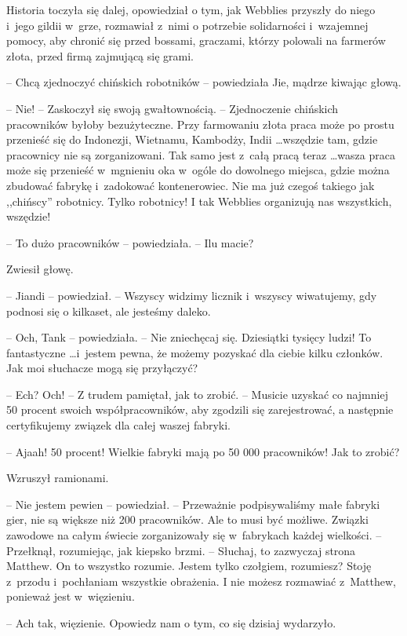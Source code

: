 \documentclass[oneside,polish,11pt,rmheadings]{mwbk}
\begin{document}
Historia toczyła się dalej, opowiedział o tym, jak Webblies przyszły do niego i~jego gildii w~grze, rozmawiał z~nimi o potrzebie solidarności i~wzajemnej pomocy, aby chronić się przed bossami, graczami, którzy polowali na farmerów złota, przed firmą zajmującą się grami.

-- Chcą zjednoczyć chińskich robotników -- powiedziała Jie, mądrze kiwając głową.

-- Nie! -- Zaskoczył się swoją gwałtownością. -- Zjednoczenie chińskich pracowników byłoby bezużyteczne. Przy farmowaniu złota praca może po prostu przenieść się do Indonezji, Wietnamu, Kambodży, Indii  \ldots  wszędzie tam, gdzie pracownicy nie są zorganizowani. Tak samo jest z~całą pracą teraz  \ldots  wasza praca może się przenieść w~mgnieniu oka w~ogóle do dowolnego miejsca, gdzie można zbudować fabrykę i~zadokować kontenerowiec. Nie ma już czegoś takiego jak ,,chińscy'' robotnicy. Tylko robotnicy! I tak Webblies organizują nas wszystkich, wszędzie!

-- To dużo pracowników -- powiedziała. -- Ilu macie? 

Zwiesił głowę. 

-- Jiandi -- powiedział. -- Wszyscy widzimy licznik i~wszyscy wiwatujemy, gdy podnosi się o kilkaset, ale jesteśmy daleko.

-- Och, Tank -- powiedziała. -- Nie zniechęcaj się. Dziesiątki tysięcy ludzi! To fantastyczne  \ldots  i~jestem pewna, że możemy pozyskać dla ciebie kilku członków. Jak moi słuchacze mogą się przyłączyć?

-- Ech? Och! -- Z trudem pamiętał, jak to zrobić. -- Musicie uzyskać co najmniej 50 procent swoich współpracowników, aby zgodzili się zarejestrować, a następnie certyfikujemy związek dla całej waszej fabryki.

-- Ajaah! 50 procent! Wielkie fabryki mają po 50 000 pracowników! Jak to zrobić? 

Wzruszył ramionami. 

-- Nie jestem pewien -- powiedział. -- Przeważnie podpisywaliśmy małe fabryki gier, nie są większe niż 200 pracowników. Ale to musi być możliwe. Związki zawodowe na całym świecie zorganizowały się w~fabrykach każdej wielkości. -- Przełknął, rozumiejąc, jak kiepsko brzmi. -- Słuchaj, to zazwyczaj strona Matthew. On to wszystko rozumie. Jestem tylko czołgiem, rozumiesz? Stoję z~przodu i~pochłaniam wszystkie obrażenia. I nie możesz rozmawiać z~Matthew, ponieważ jest w~więzieniu. 

-- Ach tak, więzienie. Opowiedz nam o tym, co się dzisiaj wydarzyło.
\end{document}
